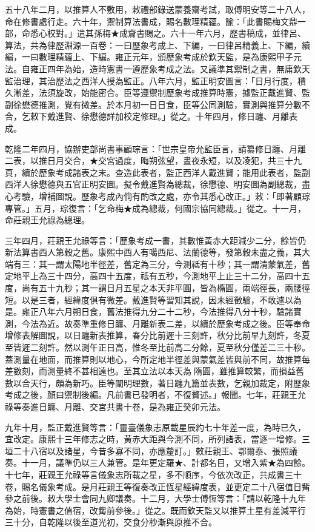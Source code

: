 \begin{pinyinscope}
五十八年二月，以推算人不敷用，敕禮部錄送蒙養齋考試，取傅明安等二十八人，命在修書處行走。六十年，禦制算法書成，賜名數理精蘊。諭：「此書賜梅文鼎一部，命悉心校對。」遣其孫梅★成齎書賜之。六十一年六月，歷書稿成，並律呂、算法，共為律歷淵源一百卷：一曰歷象考成上、下編，一曰律呂精義上、下編，續編，一曰數理精蘊上、下編。雍正元年，頒歷象考成於欽天監，是為康熙甲子元法。自雍正四年為始，造時憲書一遵歷象考成之法。又議準其禦制之書，無庸欽天監治理，其治歷法之西洋人授為監正。八年六月，監正明安圖言：「日月行度，積久漸差，法須旋改，始能密合。臣等遵禦制歷象考成推算時憲，據監正戴進賢、監副徐懋德推測，覺有微差。於本月初一日日食，臣等公同測驗，實測與推算分數不合，乞敕下戴進賢、徐懋德詳加校定修理。」從之。十年四月，修日躔、月離表成。

乾隆二年四月，協辦吏部尚書事顧琮言：「世宗皇帝允監臣言，請纂修日躔、月離二表，以推日月交合，★交宮過度，晦朔弦望，晝夜永短，以及凌犯，共三十九頁，續於歷象考成諸表之末。查造此表者，監正西洋人戴進賢；能用此表者，監副西洋人徐懋德與五官正明安圖。擬令戴進賢為總裁，徐懋德、明安圖為副總裁，盡心考驗，增補圖說。歷象考成內倘有酌改之處，亦令其悉心改正。」敕：「即著顧琮專管。」五月，琮復言：「乞命梅★成為總裁，何國宗協同總裁。」從之。十一月，命莊親王允祿為總理。

三年四月，莊親王允祿等言：「歷象考成一書，其數惟黃赤大距減少二分，餘皆仍新法算書西人第穀之舊。康熙中西人有噶西尼、法蘭德等，發第穀未盡之義，其大端有三：其一謂太陽地半徑差，舊定為三分，今測祗有十秒；其一謂清蒙氣差，舊定地平上為三十四分，高四十五度，祗有五秒，今測地平上止三十二分，高四十五度，尚有五十九秒；其一謂日月五星之本天非平圓，皆為橢圓，兩端徑長，兩腰徑短。以是三者，經緯度俱有微差。戴進賢等習知其說，因未經徵驗，不敢遽以為是。雍正八年六月朔日食，舊法推得九分二十二秒，今法推得八分十秒，驗諸實測，今法為近。故奏準重修日躔、月離新表二差，以續於歷象考成之後。臣等奉命增修表解圖說，以日躔新表推算，春分比前遲十三刻許，秋分比前早九刻許，冬夏至皆遲二刻許。然以測午正日高，惟冬至比前高二分餘，夏至秋分僅差二三十秒。蓋測量在地面，而推算則以地心，今所定地半徑差與蒙氣差皆與前不同，故推算每差數刻，而測量終不甚相遠也。至其立法以本天為隋圓，雖推算較繁，而損益舊數以合天行，頗為新巧。臣等闡明理數，著日躔九篇並表數，乞親加裁定，附歷象考成之後，顏曰禦制後編。凡前書已發明者，不復贅述。」報聞。七年，莊親王允祿等奏進日躔、月離、交宮共書十卷，是為雍正癸卯元法。

九年十月，監正戴進賢等言：「靈臺儀象志原載星辰約七十年差一度，為時已久，宜改定。康熙十三年修志之時，黃赤大距與今測不同，所列諸表，當逐一增修。三垣二十八宿以及諸星，今昔多寡不同，亦應釐訂。」敕莊親王、鄂爾泰、張照議奏。十一月，議準仍以三人兼管。是年更定羅★、計都名目，又增入紫★為四餘。十七年，莊親王允祿等言儀象志所載之星，多不順序，今依次改正，共成書三十卷，賜名儀象考成。是月莊親王等復奏改正恆星經緯度表，並更定二十八宿值日觜參之前後。敕大學士會同九卿議奏。十二月，大學士傅恆等言：「請以乾隆十九年為始，時憲書之值宿，改觜前參後。」從之。既而欽天監又以推算土星有差減平行三十分，自乾隆以後至道光初，交食分秒漸與原推不合。


\end{pinyinscope}
